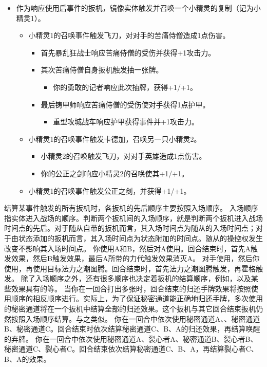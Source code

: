 \begin{itemize}
    \item 作为响应使用后事件的扳机，镜像实体触发并召唤一个小精灵的复制（记为小精灵1）。
    \begin{itemize}
        \item 小精灵1的召唤事件触发飞刀，对对手的苦痛侍僧造成1点伤害。
        \begin{itemize}
            \item 首先暴乱狂战士响应苦痛侍僧的受伤并获得+1攻击力。
            \item 其次苦痛侍僧自身扳机触发抽一张牌。
            \begin{itemize}
                \item 你的勇敢的记者响应此次抽牌，获得+1/+1。
            \end{itemize}
            \item 最后铸甲师响应苦痛侍僧的受伤使对手获得1点护甲。
            \begin{itemize}
                \item 重型攻城战车响应护甲获得事件并+1攻击力。
            \end{itemize}
        \end{itemize}
        \item 小精灵1的召唤事件触发卡德加，召唤另一只小精灵2。
        \begin{itemize}
            \item 小精灵2的召唤触发飞刀，对对手英雄造成1点伤害。
            \item 你的公正之剑响应小精灵2的召唤使其+1/+1。
        \end{itemize}
        \item 小精灵1的召唤事件触发公正之剑，并获得+1/+1。
    \end{itemize}
\end{itemize}

结算某事件触发的所有扳机时，各扳机的先后顺序主要按照入场顺序。
\notice 入场顺序指实体进入战场的顺序。判断两个扳机间的入场顺序，就是判断两个扳机进入战场时间点的先后。对于随从自带的扳机而言，其入场时间点为随从的入场时间点；对于由状态添加的扳机而言，其入场时间点为状态附加的时间点。随从的操控权发生改变不影响其入场时间点。
\example 你使用A和B，然后对A使用。回合结束时，首先A触发效果，然后B触发效果，最后A所带的力代触发效果消灭A。
\example 对手使用，然后你使用，再使用目标法力之潮图腾。回合结束时，首先法力之潮图腾触发，再霍格触发。
\notice 除了入场顺序之外，还有很多顺序也决定着扳机的结算顺序，例如，以及某些效果具有的等。
\notice 当你在一回合打出多张时，回合结束的归还手牌效果将按照使用顺序的相反顺序进行。实际上，为了保证秘密通道能正确地归还手牌，多次使用的秘密通道将在一个扳机中结算全部的归还效果。这个扳机与其它回合结束扳机仍然按照入场顺序结算。与之类似。
\example 你在一回合中依次使用秘密通道A、、秘密通道B、秘密通道C。回合结束时依次结算秘密通道C、B、A的归还效果，再结算唤醒的弃牌。
\example 你在一回合中依次使用秘密通道A、裂心者A、秘密通道B、裂心者B、秘密通道C、裂心者C。回合结束依次结算秘密通道C、B、A，再结算裂心者C、B、A的效果。

